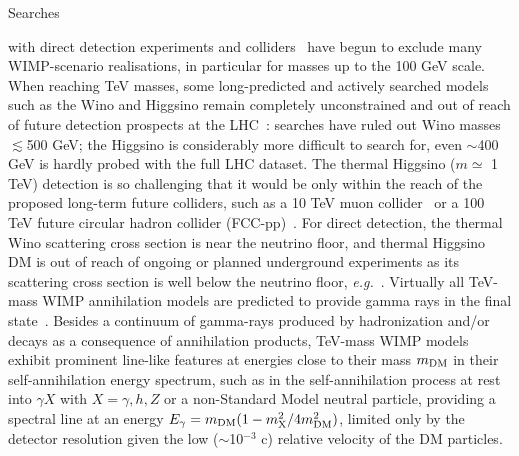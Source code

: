 \documentclass[aps,prl,twocolumn,floats,balancelastpage,showpacs,showkeys,preprintnumbers,floatfix,nofootinbib,superscriptaddress, longbibliography]{revtex4-1}
\begin{document}
Searches

with direct detection experiments
and colliders~\cite{Schumann:2019eaa,Kahlhoefer:2017dnp} have begun to exclude many WIMP-scenario realisations, in particular for masses up to the 100 GeV scale. When reaching TeV masses, some long-predicted and actively searched models such as the Wino and Higgsino remain completely unconstrained and out of reach of future detection prospects at the LHC~\cite{Bottaro:2021snn,Bottaro:2022one}: searches have ruled out Wino masses $\lesssim$500 GeV; the Higgsino is considerably more difficult to search for, even $\sim$400 GeV is hardly probed with the full LHC dataset.
The thermal Higgsino ($m \simeq$ 1 TeV) detection is so challenging that it would be only within the reach of the proposed long-term future colliders, such as a 10 TeV muon collider~\cite{Capdevilla:2021fmj} or a 100 TeV future circular hadron collider (FCC-pp)~\cite{Saito:2019rtg}.
For direct detection,
the thermal Wino scattering cross section is near the neutrino floor, and thermal Higgsino DM is out of reach of ongoing or planned underground experiments as its scattering cross section is well below the neutrino floor, \textit{e.g.}~\cite{Hill:2011be,Hill:2013hoa,Hill:2014yka,Hisano:2015rsa,Chen:2019gtm}. Virtually all TeV-mass WIMP annihilation models are predicted to provide gamma rays in the final state~\cite{Cirelli:2010xx}.
Besides a continuum of gamma-rays produced by hadronization and/or decays as a consequence of annihilation products, TeV-mass WIMP models exhibit prominent line-like features at energies close to their mass $m_{\rm DM}$ in their self-annihilation energy spectrum, such as in the self-annihilation process at rest into $\gamma X$ with $X = \gamma, h, Z$ or a non-Standard Model neutral particle, providing a spectral line at an energy $E_\gamma = m_{\rm DM}(1-m^2_{\rm X}/4m^2_{\rm DM})$, limited only by the detector resolution given the low ($\sim$10$^{−3}$ c) relative velocity of the DM particles.
\end{document}
